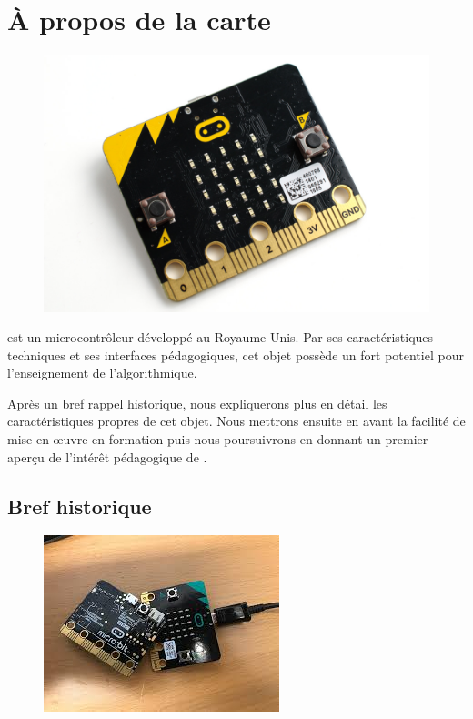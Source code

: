 \section{À propos de la carte \mb}
\pagestyle{plain}

\begin{figure}
    \includegraphics[width=\linewidth]{res/mb-ap-01.png}
\end{figure}

\mb est un microcontrôleur développé au Royaume-Unis. Par ses caractéristiques techniques et ses interfaces pédagogiques, cet objet possède un fort potentiel pour l’enseignement de l’algorithmique.

Après un bref rappel historique, nous expliquerons plus en détail les caractéristiques propres de cet objet. Nous mettrons ensuite en avant la facilité de mise en œuvre en formation puis nous poursuivrons en donnant un premier aperçu de l’intérêt pédagogique de \mb.

\subsection{Bref historique}

\begin{figure}
    \includegraphics[width=\linewidth]{res/mb-ap-03}
\end{figure}


